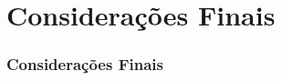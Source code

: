 \section{Considerações Finais}
\begin{frame}
\frametitle{Considerações Finais}
\label{consideracoes_finais}

\end{frame}